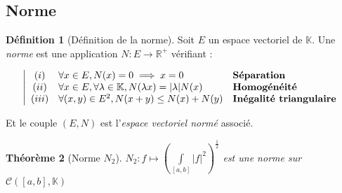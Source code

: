 \documentclass[11pt,a4paper]{report}
\newtheorem{theorem}{Théorème}[chapter]
\theoremstyle{definition}
\newtheorem{dfn}[theorem]{Définition}
\begin{document}
\subsection{Norme}
\begin{dfn}[Définition de la norme]
Soit $E$ un espace vectoriel de
$\mathbb{K}$. Une \emph{norme} 
est une application $N : E \to \ensuremath{\mathbb{R}}^+$ vérifiant : 

\begin{equation}
\left| 
\begin{array}{c l l}
(i)&\forall x \in E, N(x)=0 \implies x=0 &\textbf{Séparation}\\
(ii)&\forall x \in E, \forall \lambda \in \mathbb{K}, N(\lambda x)=|\lambda|N(x) &\textbf{Homogénéité}\\
(iii)&\forall (x,y) \in E^2, N(x+y)\le N(x)+N(y)&\textbf{Inégalité triangulaire}\\
\end{array}
\right.
\end{equation}


Et le couple $(E,N)$ est l'\emph{espace
vectoriel normé} associé.
\end{dfn}
\begin{theorem}[Norme $N_2$]
$N_2 : f \mapsto \left( \int \limits_{[a,b]} |f|^2 \right)^{\frac{1}{2}}$ est une norme sur $\mathcal{C}\left( [a,b], \mathbb{K} \right)$
\end{theorem}
\end{document}
